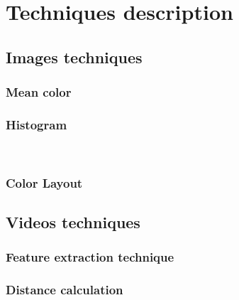 \section{Techniques description}
\subsection{Images techniques}

\subsubsection{Mean color}


\subsubsection{Histogram}

\



\subsubsection{Color Layout}

\subsection{Videos techniques}
\subsubsection{Feature extraction technique}

\subsubsection{Distance calculation}
